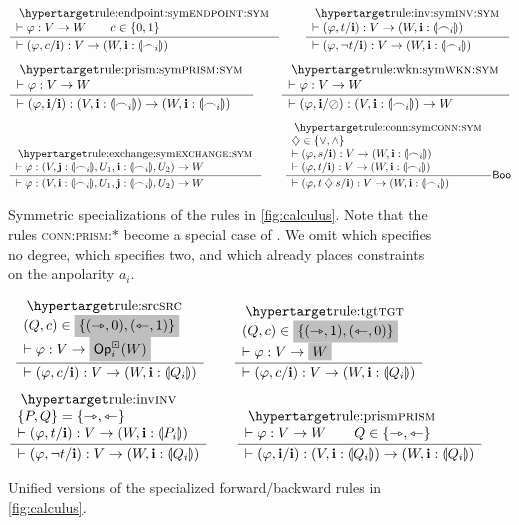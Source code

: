 \documentclass[a4paper]{memoir}
\begin{document}
\begin{figure}[htb]
	\[
		\inferencel{endpoint:sym}{
			\sez \vfi : V \to W
			\qquad
			c \in \accol{0, 1}
		}{
			\sez (\vfi, c/\dm i) : V \to (W, \dm i : \rival{\edge_i})
		}{}
		\qquad
		\inferencel{inv:sym}{
			\sez (\vfi, t/\dm i) : V \to (W, \dm i : \rival{\edge_i})
		}{
			\sez (\vfi, \lnot t/\dm i) : V \to (W, \dm i : \rival{\edge_i})
		}{}
	\]
	\[
		\inferencel{prism:sym}{
			\sez \vfi : V \to W
		}{
			\sez (\vfi, \dm i / \dm i) : (V, \dm i : \rival{\edge_i}) \to (W, \dm i : \rival{\edge_i})
		}{}
		\qquad
		\inferencel{wkn:sym}{
			\sez \vfi : V \to W
		}{
			\sez (\vfi, \dm i / \novar) : (V, \dm i : \rival{\edge_i}) \to W
		}{}
	\]
	\[
		\inferencel{exchange:sym}{
			\sez \vfi : (V, \dm j : \rival{\edge_i}, U_1, \dm i : \rival{\edge_i}, U_2) \to W
		}{
			\sez \vfi : (V, \dm i : \rival{\edge_i}, U_1, \dm j : \rival{\edge_i}, U_2) \to W
		}{}
		\qquad
		\inferencel{conn:sym}{
			\opA \in \accol{{\vee}, {\wedge}} \\
			\sez (\vfi, s / \dm i) : V \to (W, \dm i : \rival{\edge_i}) \\
			\sez (\vfi, t / \dm i) : V \to (W, \dm i : \rival{\edge_i})
		}{
			\sez (\vfi, t \opA s / \dm i) : V \to (W, \dm i : \rival{\edge_i})
		}{$\booleanalg$}
	\]
	\caption{Symmetric specializations of the rules in \cref{fig:calculus}. Note that the rules \textsc{conn:prism:}$*$ become a special case of . We omit  which specifies no degree,  which specifies two, and  which already places constraints on the anpolarity $a_i$.}
	\label{fig:calculus:sym}
\end{figure}
\begin{figure}[htb]
	\[
		\inferencel{src}{
			(Q, c) \in \mathemph{\accol{(\jet, 0), (\tej, 1)}} \\
			\sez \vfi : V \to \mathemph{\Opcube_i(W)}
		}{
			\sez (\vfi, c/\dm i) : V \to (W, \dm i : \rival{Q_i})
		}{}
		\qquad
		\inferencel{tgt}{
			(Q, c) \in \mathemph{\accol{(\jet, 1), (\tej, 0)}} \\
			\sez \vfi : V \to \mathemph{W}
		}{
			\sez (\vfi, c/\dm i) : V \to (W, \dm i : \rival{Q_i})
		}{}
	\]
	\[
		\inferencel{inv}{
			\accol{P, Q} = \accol{\jet, \tej} \\
			\sez (\vfi, t/\dm i) : V \to (W, \dm i : \rival{P_i})
		}{
			\sez (\vfi, \lnot t/\dm i) : V \to (W, \dm i : \rival{Q_i})
		}{}
		\qquad
		\inferencel{prism}{
			\sez \vfi : V \to W
			\qquad
			Q \in \accol{\jet, \tej}
		}{
			\sez (\vfi, \dm i / \dm i) : (V, \dm i : \rival{Q_i}) \to (W, \dm i : \rival{Q_i})
		}{}
	\]
	\caption{Unified versions of the specialized forward/backward rules in \cref{fig:calculus}.}
	\label{fig:calculus:general}
\end{figure}
\end{document}
